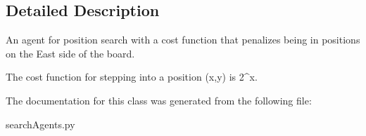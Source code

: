 \subsection{Detailed Description}
\begin{DoxyVerb}An agent for position search with a cost function that penalizes being in
positions on the East side of the board.

The cost function for stepping into a position (x,y) is 2^x.
\end{DoxyVerb}
 

The documentation for this class was generated from the following file\+:\begin{DoxyCompactItemize}
\item 
search\+Agents.\+py\end{DoxyCompactItemize}
